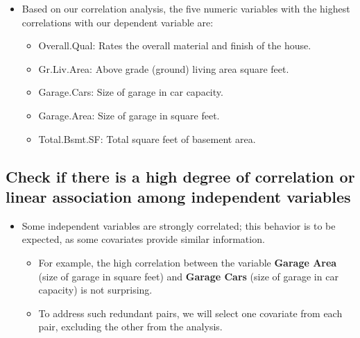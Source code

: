 \documentclass[aoas]{imsart}
\providecommand{\tightlist}{%
  \setlength{\itemsep}{0pt}\setlength{\parskip}{0pt}}
\numberwithin{equation}{section}
\theoremstyle{plain}
\theoremstyle{remark}
\begin{document}
\begin{itemize}
\tightlist
\item
  Based on our correlation analysis, the five numeric variables with the
  highest correlations with our dependent variable are: \vspace{0.2cm}

  \begin{itemize}
  \tightlist
  \item
    Overall.Qual: Rates the overall material and finish of the house.
  \item
    Gr.Liv.Area: Above grade (ground) living area square feet.
  \item
    Garage.Cars: Size of garage in car capacity.
  \item
    Garage.Area: Size of garage in square feet.
  \item
    Total.Bsmt.SF: Total square feet of basement area.
  \end{itemize}
\end{itemize}

\hypertarget{check-if-there-is-a-high-degree-of-correlation-or-linear-association-among-independent-variables}{%
\subsection{Check if there is a high degree of correlation or linear
association among independent
variables}\label{check-if-there-is-a-high-degree-of-correlation-or-linear-association-among-independent-variables}}

\begin{itemize}
\tightlist
\item
  Some independent variables are strongly correlated; this behavior is
  to be expected, as some covariates provide similar information.
  \vspace{0.2cm}

  \begin{itemize}
  \tightlist
  \item
    For example, the high correlation between the variable
    \textbf{Garage Area} (size of garage in square feet) and
    \textbf{Garage Cars} (size of garage in car capacity) is not
    surprising.
  \item
    To address such redundant pairs, we will select one covariate from
    each pair, excluding the other from the analysis.
  \end{itemize}
\end{itemize}
\end{document}

